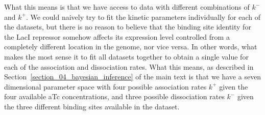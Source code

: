 What this means is that we have access to data with different combinations of
$k^-$ and $k^+$. We could naively try to fit the kinetic parameters individually
for each of the datasets, but there is no reason to believe that the binding
site identity for the LacI repressor somehow affects its expression level
controlled from a completely different location in the genome, nor vice versa.
In other words, what makes the most sense it to fit all datasets together to
obtain a single value for each of the association and dissociation rates. What
this means, as described in Section~\ref{section_04_bayesian_inference} of the main text
is that we have a seven dimensional parameter space with four possible
association rates $k^+$ given the four available aTc concentrations, and three
possible dissociation rates $k^-$ given the three different binding sites
available in the dataset.

